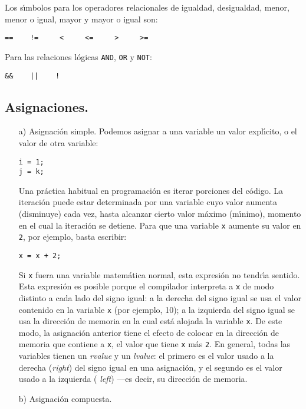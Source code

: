 Los s{\'\i}mbolos para los operadores relacionales de igualdad, desigualdad,
menor, menor o igual, mayor y mayor o igual son:

\begin{verbatim}
==    !=     <     <=     >     >=
\end{verbatim}
Para las relaciones l{\'o}gicas \verb+AND+, \verb+OR+ y \verb+NOT+:

\begin{verbatim}
&&    ||    !     
\end{verbatim}

\subsection{Asignaciones.}

\begin{enumerate}
\item[a)] Asignaci{\'o}n simple.
Podemos asignar a una variable un valor expl\'{\i}cito, o el valor de
otra variable:
\begin{verbatim}
i = 1;
j = k;
\end{verbatim}

Una pr\'actica habitual en programaci\'on es iterar porciones del
c\'odigo. La iteraci\'on puede estar determinada por una variable cuyo
valor aumenta (disminuye) cada vez, hasta alcanzar cierto valor
m\'aximo (m\'{\i}nimo), momento en el cual la iteraci\'on se
detiene. Para que una variable \verb+x+ aumente su valor en \verb+2+,
por ejemplo, basta escribir:
\begin{verbatim}
x = x + 2;
\end{verbatim}
Si \verb+x+ fuera una variable matem\'atica normal, esta expresi\'on
no tendr\'{\i}a sentido. Esta expresi\'on es posible porque el
compilador interpreta a \verb+x+ de modo distinto a cada lado del
signo igual: a la derecha del signo igual se usa el valor contenido en
la variable \verb+x+ (por ejemplo, 10); a la izquierda del signo igual
se usa la direcci\'on de memoria en la cual est\'a alojada la variable
\verb+x+. De este modo, la asignaci\'on anterior tiene el efecto de
colocar en la direcci\'on de memoria que contiene a \verb+x+, el valor
que tiene \verb+x+ m\'as \verb+2+. En general, todas las variables
tienen un {\em rvalue\/} y un {\em lvalue\/}: el primero es el valor
usado a la derecha ({\em right\/}) del signo igual en una
asignaci\'on, y el segundo es el valor usado a la izquierda ({\em
  left\/}) ---es decir, su direcci\'on de memoria. 

\item[b)] Asignaci{\'o}n compuesta.


\end{enumerate}
